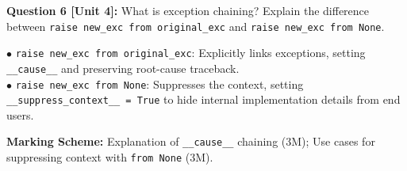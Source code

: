 \noindent\textbf{Question 6 [Unit 4]:} What is exception chaining? Explain the difference between \texttt{raise new\_exc from original\_exc} and \texttt{raise new\_exc from None}.
\begin{solutionbox}
$\bullet$ \texttt{raise new\_exc from original\_exc}: Explicitly links exceptions, setting \texttt{\_\_cause\_\_} and preserving root-cause traceback.\\
$\bullet$ \texttt{raise new\_exc from None}: Suppresses the context, setting \texttt{\_\_suppress\_context\_\_ = True} to hide internal implementation details from end users.
\end{solutionbox}
\begin{markingrubric}
\textbf{Marking Scheme:} Explanation of \texttt{\_\_cause\_\_} chaining (3M); Use cases for suppressing context with \texttt{from None} (3M).
\end{markingrubric}
